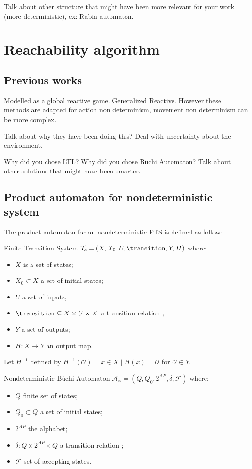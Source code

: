 Talk about other structure that might have been more relevant for your work (more deterministic), ex: Rabin automaton.

\section{Reachability algorithm}

\subsection{Previous works}

Modelled as a global reactive game. Generalized Reactive.
However these methods are adapted for action non determinism, movement non determinism can be more complex.

Talk about why they have been doing this? Deal with uncertainty about the environment.

Why did you chose LTL?
Why did you chose B\"uchi Automaton?
Talk about other solutions that might have been smarter.

\subsection{Product automaton for nondeterministic system}

The product automaton for an nondeterministic FTS is defined as follow:

\begin{nameddef}{Finite Transition System}
$\mathcal{T}_c = (X,X_0,U, \transition, Y,H)$
where:
\begin{itemize}[noitemsep,nolistsep]
\item $X$ is a set of states;
\item $X_0 \subset X$ a set of initial states;
\item $U$ a set of inputs;
\item $\transition \subseteq X \times U \times X$ a transition relation ;
\item $Y$ a set of outputs;
\item $H:X \rightarrow Y$ an output map.\popQED
\end{itemize}
\end{nameddef}

Let $H^{-1}$ defined by $H^{-1}(\mathcal{O}) = {x \in X \mid H(x)=\mathcal{O}}$ for $\mathcal{O} \in Y$.

\begin{nameddef}{Nondeterministic B\"{u}chi Automaton}
$\mathcal{A}_{\varphi} = (Q, Q_0, 2^{AP}, \delta, \mathcal{F})$
where:
\begin{itemize}[noitemsep,nolistsep,topsep=0pt,after=\relax]
\item $Q$ finite set of states;
\item $Q_0 \subset Q$ a set of initial states;
\item $2^{AP}$ the alphabet;
\item $\delta: Q \times 2^{AP} \times Q$ a transition relation ;
\item $\mathcal{F}$ set of accepting states.\popQED
\end{itemize}
\end{nameddef}

